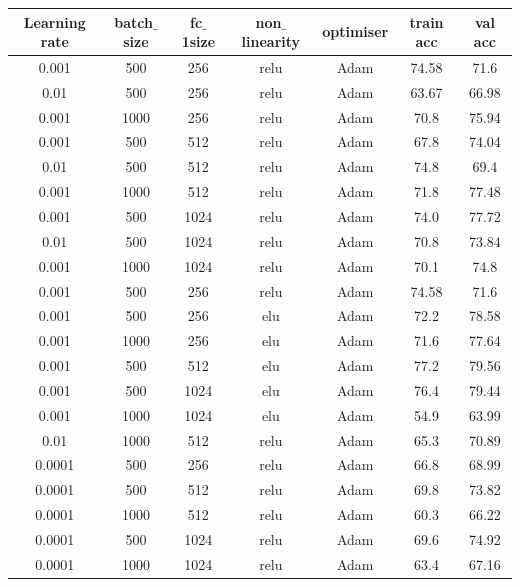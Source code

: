 \documentclass[12pt]{report}
\begin{document}
 

\begin{table}[H]
	\label{T:equipos}
	\begin{center}
		\begin{tabular}{| c | c | c | c | c | c | c |}
			\hline
			\textbf{Learning rate} & \textbf{batch$\_$size} & \textbf{fc$\_$1size} & \textbf{non$\_$linearity} & \textbf{optimiser} & \textbf{train acc} & \textbf{val acc}\\ 
			\hline
			\hline
			0.001 & 500 & 256 & relu & Adam & 74.58 & 71.6\\
            0.01 & 500 & 256 & relu & Adam & 63.67 & 66.98\\
            \hline
            0.001 & 1000 & 256 & relu & Adam & 70.8 & 75.94\\
            0.001 & 500 & 512 & relu & Adam & 67.8 & 74.04\\
            0.01 & 500 & 512 & relu & Adam & 74.8 & 69.4\\
            0.001 & 1000 & 512 & relu & Adam & 71.8 & 77.48\\
            0.001 & 500 & 1024 & relu & Adam & 74.0 & 77.72 \\
            0.01 & 500 & 1024 & relu & Adam & 70.8 & 73.84 \\
            0.001 & 1000 & 1024 & relu & Adam & 70.1 & 74.8 \\
            0.001 & 500 & 256 & relu & Adam & 74.58 & 71.6 \\
            \hline
            0.001 & 500 & 256 & elu & Adam & 72.2 & 78.58\\
            0.001 & 1000 & 256 & elu & Adam & 71.6 & 77.64\\
            0.001 & 500 & 512 & elu & Adam & 77.2 & 79.56 \\
            0.001 & 500 & 1024 & elu & Adam & 76.4 & 79.44 \\
            0.001 & 1000 & 1024 & elu & Adam & 54.9 & 63.99 \\
            0.01 & 1000 & 512 & relu & Adam & 65.3 & 70.89 \\
            \hline
            0.0001 & 500 & 256 & relu & Adam & 66.8 & 68.99\\
            0.0001 & 500 & 512 & relu & Adam & 69.8 & 73.82\\
            0.0001 & 1000 & 512 & relu & Adam & 60.3 & 66.22 \\
            0.0001 & 500 & 1024 & relu & Adam & 69.6 & 74.92 \\
            0.0001 & 1000 & 1024 & relu & Adam & 63.4 & 67.16 \\

\end{tabular}
\end{center}
\end{table}
\end{document}
